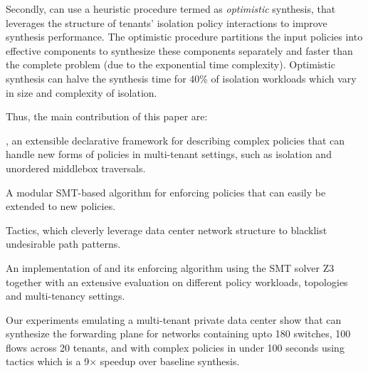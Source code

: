  Secondly, \Name can use a heuristic procedure termed as
 \emph{optimistic} synthesis, that leverages the structure of tenants'
 isolation policy interactions to improve synthesis performance. The
 optimistic procedure partitions the input policies
  into effective components to synthesize these
 components separately and faster than the complete problem (due to
 the exponential time complexity). Optimistic synthesis can halve the
 synthesis time for 40\% of isolation workloads  
 which vary in size and complexity of isolation.


\noindent Thus, the main contribution of this paper are: 
\begin{compactitemize}
\item \Name, an extensible declarative framework for describing
  complex policies that can handle new forms of policies in
  multi-tenant settings, such as isolation and unordered middlebox
  traversals.
\item A modular SMT-based algorithm for enforcing \Name policies that
  can easily be extended to new policies.
\item Tactics, which cleverly leverage data center network structure
  to blacklist undesirable path patterns. %
\item An implementation of \Name and its enforcing algorithm using the SMT
		solver Z3 together with an extensive evaluation on different policy workloads, topologies and multi-tenancy settings.
                \item Our experiments emulating a multi-tenant private
                  data center show that \Name can synthesize the
                  forwarding plane for networks containing upto 180
                  switches, 100 flows across 20 tenants, and with complex policies in
                  under 100 seconds using tactics which is a 9$\times$ speedup over baseline synthesis. 
\end{compactitemize}

